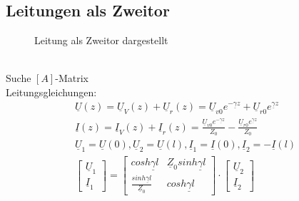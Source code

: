 \subsection{Leitungen als Zweitor}
\begin{figure}[!h]
	\centering
	
	\caption{Leitung als Zweitor dargestellt}
	\label{fig:leitungstheorie:zweitor}
\end{figure}\\
Suche $[A]$-Matrix\\
Leitungsgleichungen:\\
\begin{align}
	\underline{U}(z)=\underline{U}_V(z)+\underline{U}_r(z)=\underline{U}_{v0}e^{-\underline{\gamma}z}+\underline{U}_{r0}e^{\underline{\gamma}z}\nonumber\\
	\underline{I}(z)=\underline{I}_V(z)+\underline{I}_r(z)=\frac{\underline{U}_{v0}e^{-\underline{\gamma}z}}{Z_0}-\frac{\underline{U}_{r0}e^{\underline{\gamma}z}}{Z_0}\nonumber\\
	\underline{U}_1=\underline{U}(0), \underline{U}_2=\underline{U}(l),
	\underline{I}_1=\underline{I}(0), \underline{I}_2=-\underline{I}(l)\nonumber\\
	\begin{bmatrix}
 		\underline{U}_1\\
 		\underline{I}_1
	\end{bmatrix}=
	\begin{bmatrix}
 		cosh\underline{\gamma}l & \underline{Z}_0sinh\underline{\gamma}l\\
 		\frac{sinh\underline{\gamma}l}{\underline{Z}_0} & cosh\underline{\gamma}l
	\end{bmatrix}\cdot
	\begin{bmatrix}
		\underline{U}_2\\
		\underline{I}_2
	\end{bmatrix}\nonumber
\end{align}

